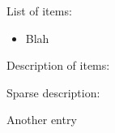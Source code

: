 List of items: \vspace{-0.3cm}
\begin{itemize} \itemsep -4pt
\item Blah
\end{itemize}

Description of items: \vspace{-0.3cm}
\begin{description} \itemsep -4pt
\item[Key] Sparse description: \vspace{-0.3cm}
	\begin{description} \itemsep -2pt
	\item[key] Another entry
	\end{description}
\end{description}




